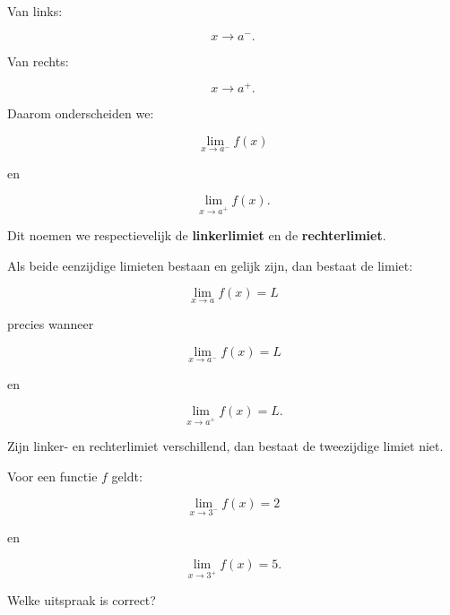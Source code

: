 \documentclass{ximera}
\begin{document}
Van links:

\[
x\to a^-.
\]

Van rechts:

\[
x\to a^+.
\]

Daarom onderscheiden we:

\[
\boxed{
\lim_{x\to a^-}f(x)
}
\]

en

\[
\boxed{
\lim_{x\to a^+}f(x).
}
\]

Dit noemen we respectievelijk de \textbf{linkerlimiet} en de
\textbf{rechterlimiet}.

\begin{eigenschap}

Als beide eenzijdige limieten bestaan en gelijk zijn, dan bestaat de
limiet:

\[
\boxed{
\lim_{x\to a}f(x)=L
}
\]

precies wanneer

\[
\lim_{x\to a^-}f(x)=L
\]

en

\[
\lim_{x\to a^+}f(x)=L.
\]

Zijn linker- en rechterlimiet verschillend, dan bestaat de
tweezijdige limiet niet.

\end{eigenschap}



\begin{oefening}{\oefB\ESS}

Voor een functie $f$ geldt:

\[
\lim_{x\to3^-}f(x)=2
\]

en

\[
\lim_{x\to3^+}f(x)=5.
\]

Welke uitspraak is correct?

\begin{multipleChoice}
\end{multipleChoice}

\end{oefening}


\end{document}
